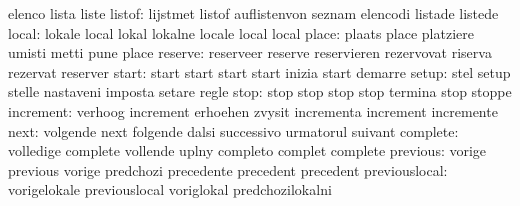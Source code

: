                            elenco                    lista
                           liste
                   listof: lijstmet                  listof
                           auflistenvon              seznam
                           elencodi                  listade
                           listede
                    local: lokale                    local
                           lokal                     lokalne
                           locale                    local
                           local
                    place: plaats                    place
                           platziere                 umisti
                           metti                     pune
                           place
                  reserve: reserveer                 reserve
                           reservieren               rezervovat
                           riserva                   rezervat
                           reserver
                    start: start                     start
                           start                     start
                           inizia                    start
                           demarre
                    setup: stel                      setup
                           stelle                    nastaveni
                           imposta                   setare
                           regle
                     stop: stop                      stop
                           stop                      stop
                           termina                   stop
                           stoppe
                increment: verhoog                   increment
                           erhoehen                  zvysit
                           incrementa                increment
                           incremente
                     next: volgende                  next
                           folgende                  dalsi
                           successivo                urmatorul
                           suivant
                 complete: volledige                 complete
                           vollende                  uplny
                           completo                  complet
                           complete
                 previous: vorige                    previous
                           vorige                    predchozi
                           precedente                precedent
                           precedent
            previouslocal: vorigelokale              previouslocal
                           voriglokal                predchozilokalni
